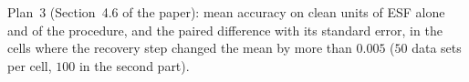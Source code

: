 \begin{table}[htbp]
\centering
\small
\caption{Plan~3 (Section~4.6 of the paper): mean accuracy on clean units of ESF alone and of the
procedure, and the paired difference with its standard error, in the cells where the recovery
step changed the mean by more than $0.005$ ($50$ data sets per cell, $100$ in the second part).}
\label{tab:gate2}

\end{table}
